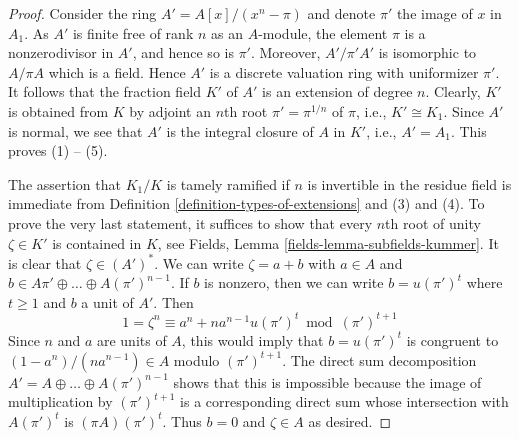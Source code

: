 \documentclass[10pt,a4paper]{amsart}
\theoremstyle{plain}
\theoremstyle{definition}
\theoremstyle{remark}
\numberwithin{equation}{subsection}
\begin{document}
\begin{proof}
Consider the ring $A' = A[x]/(x^n - \pi)$ and denote $\pi'$ the image
of $x$ in $A_1$. As $A'$ is finite free of rank $n$ as an $A$-module,
the element $\pi$ is a nonzerodivisor in $A'$, and hence so is $\pi'$.
Moreover, $A'/\pi'A'$ is isomorphic to $A/\pi A$ which is a field.
Hence $A'$ is a discrete valuation ring with uniformizer $\pi'$.
It follows that the fraction field $K'$ of $A'$ is an extension of degree $n$.
Clearly, $K'$ is obtained from $K$ by adjoint an $n$th root
$\pi' = \pi^{1/n}$ of $\pi$, i.e., $K' \cong K_1$.
Since $A'$ is normal, we see that $A'$ is the
integral closure of $A$ in $K'$, i.e., $A' = A_1$. This proves (1) -- (5).

\medskip\noindent
The assertion that $K_1/K$ is tamely ramified if $n$ is invertible in
the residue field is immediate from
Definition \ref{definition-types-of-extensions} and (3) and (4).
To prove the very last statement, it suffices to show that
every $n$th root of unity $\zeta \in K'$ is contained in $K$, see
Fields, Lemma \ref{fields-lemma-subfields-kummer}.
It is clear that $\zeta \in (A')^*$. We can write $\zeta = a + b$
with $a \in A$ and $b \in A \pi' \oplus \ldots \oplus A (\pi')^{n - 1}$.
If $b$ is nonzero, then we can write $b = u(\pi')^t$ where
$t \geq 1$ and $b$ a unit of $A'$. Then
$$
1 = \zeta^n \equiv a^n + n a^{n - 1} u (\pi')^t \bmod (\pi')^{t + 1}
$$
Since $n$ and $a$ are units of $A$, this would imply that
$b = u(\pi')^t$ is congruent to $(1 - a^n)/(n a^{n - 1}) \in A$
modulo $(\pi')^{t + 1}$. The direct sum decomposition
$A' = A \oplus \ldots \oplus A(\pi')^{n - 1}$ shows that
this is impossible because the image of multiplication by
$(\pi')^{t + 1}$ is a corresponding direct sum whose intersection
with $A(\pi')^t$ is $(\pi A)(\pi')^t$. Thus $b = 0$ and $\zeta \in A$
as desired.
\end{proof}
\end{document}
